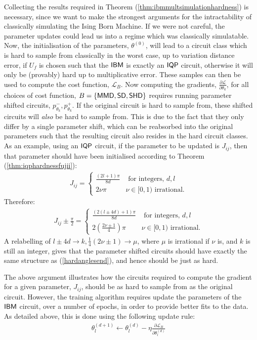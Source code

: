 Collecting the results required in Theorem (\ref{thm:ibmmultsimulationhardness}) is necessary, since we want to make the strongest arguments for the intractability of classically simulating the Ising Born Machine. If we were not careful, the parameter updates could lead us into a regime which was classically simulatable.
Now, the initialisation of the parameters, $\theta^{(0)}$, will lead to a circuit class which is hard to sample from classically in the worst case, up to variation distance error, if $U_f$ is chosen such that the $\textsf{IBM}$ is exactly an $\operatorname{\textsf{IQP}}$ circuit, otherwise it will only be (provably) hard up to multiplicative error. These samples can then be used to compute the cost function, $\mathcal{L}_B$. Now computing the gradients, $\frac{\partial \mathcal{L}}{\partial \theta_k}$, for all choices of cost function, $B = \{\operatorname{\textsf{MMD}}, \operatorname{\textsf{SD}}, \operatorname{\textsf{SHD}}\}$ requires running parameter shifted circuits, $p^-_{\theta_k}, p^+_{\theta_k}$. If the original circuit is hard to sample from, these shifted circuits will \textit{also} be hard to sample from. This is due to the fact that they only differ by a single parameter shift, which can be reabsorbed into the original parameters such that the resulting circuit also resides in the hard circuit classes. As an example, using an $\operatorname{\textsf{IQP}}$ circuit, if the parameter to be updated is $J_{ij}$, then that parameter should have been initialised according to Theorem (\ref{thm:iqphardnessfujii}):
\begin{align}
J_{ij} = \begin{cases}
\frac{(2l+1)\pi}{8d} &\text{ for integers, } d, l\\
 2\nu \pi& \nu \in[0,1) \text{ irrational.}
 \end{cases} \label{hardanglesend}
\end{align}
Therefore:
\begin{align}
J_{ij}\pm \frac{\pi}{2} = \begin{cases}
\frac{(2(l \pm 4d)+1)\pi}{8d} &\text{ for integers, } d, l\\
 2\left(\frac{2\nu \pm 1}{4}\right) \pi& \nu \in[0,1) \text{ irrational.}
 \end{cases}
\end{align}
A relabelling of $l\pm 4d \rightarrow k, \frac{1}{4}(2\nu \pm 1) \rightarrow \mu$, where $\mu$ is irrational if $\nu$ is, and $k$ is still an integer, gives that the parameter shifted circuits should have exactly the same structure as (\ref{hardanglesend}), and hence should be just as hard. 

The above argument illustrates how the circuits required to compute the gradient for a given parameter, $J_{ij}$, should be as hard to sample from as the original circuit. However, the training algorithm requires update the parameters of the $\textsf{IBM}$ circuit, over a number of epochs, in order to provide better fits to the data. As detailed above, this is done using the following update rule:
\begin{align}
    \theta_l^{(d+1)} \leftarrow \theta_l^{(d)} - \eta \frac{\partial \mathcal{L}_B}{\partial \theta^{(d)}_l} \label{updaterule}
\end{align}

